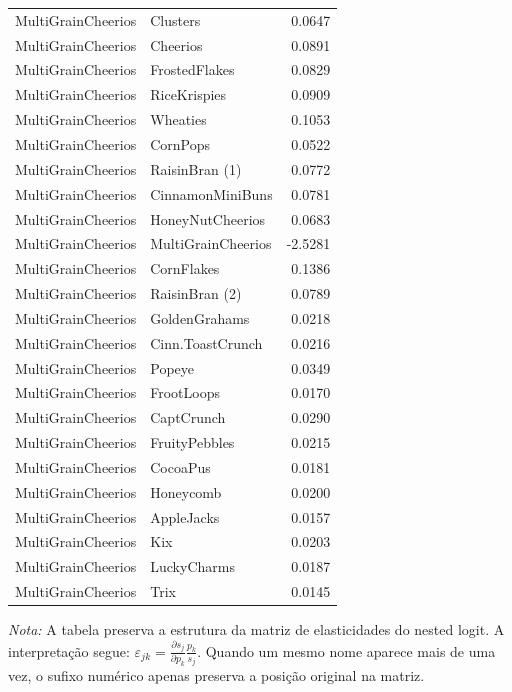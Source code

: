 \begin{table}[H]
\begin{tabular}{llr}
MultiGrainCheerios & Clusters & 0.0647 \\
MultiGrainCheerios & Cheerios & 0.0891 \\
MultiGrainCheerios & FrostedFlakes & 0.0829 \\
MultiGrainCheerios & RiceKrispies & 0.0909 \\
MultiGrainCheerios & Wheaties & 0.1053 \\
MultiGrainCheerios & CornPops & 0.0522 \\
MultiGrainCheerios & RaisinBran (1) & 0.0772 \\
MultiGrainCheerios & CinnamonMiniBuns & 0.0781 \\
MultiGrainCheerios & HoneyNutCheerios & 0.0683 \\
MultiGrainCheerios & MultiGrainCheerios & -2.5281 \\
MultiGrainCheerios & CornFlakes & 0.1386 \\
MultiGrainCheerios & RaisinBran (2) & 0.0789 \\
MultiGrainCheerios & GoldenGrahams & 0.0218 \\
MultiGrainCheerios & Cinn.ToastCrunch & 0.0216 \\
MultiGrainCheerios & Popeye & 0.0349 \\
MultiGrainCheerios & FrootLoops & 0.0170 \\
MultiGrainCheerios & CaptCrunch & 0.0290 \\
MultiGrainCheerios & FruityPebbles & 0.0215 \\
MultiGrainCheerios & CocoaPus & 0.0181 \\
MultiGrainCheerios & Honeycomb & 0.0200 \\
MultiGrainCheerios & AppleJacks & 0.0157 \\
MultiGrainCheerios & Kix & 0.0203 \\
MultiGrainCheerios & LuckyCharms & 0.0187 \\
MultiGrainCheerios & Trix & 0.0145 \\
\bottomrule
\end{tabular}

\vspace{0.3em}
\footnotesize
\textit{Nota:} A tabela preserva a estrutura da matriz de elasticidades do nested logit. A interpretação segue: $\varepsilon_{jk}=\frac{\partial s_j}{\partial p_k}\frac{p_k}{s_j}$. Quando um mesmo nome aparece mais de uma vez, o sufixo numérico apenas preserva a posição original na matriz.
\end{table}
\endgroup

